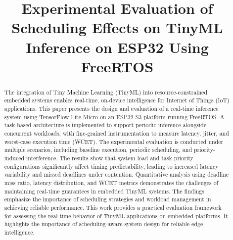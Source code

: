 \documentclass[conference]{IEEEtran}
\begin{document}
\title{Experimental Evaluation of Scheduling Effects on TinyML Inference on ESP32 Using FreeRTOS\\
}


\author{
\and
{}
}




\maketitle
\begin{abstract}
The integration of Tiny Machine Learning (TinyML) into resource-constrained embedded systems enables real-time, on-device intelligence for Internet of Things (IoT) applications. This paper presents the design and evaluation of a real-time inference system using TensorFlow Lite Micro on an ESP32-S3 platform running FreeRTOS. A task-based architecture is implemented to support periodic inference alongside concurrent workloads, with fine-grained instrumentation to measure latency, jitter, and worst-case execution time (WCET). The experimental evaluation is conducted under multiple scenarios, including baseline execution, periodic scheduling, and priority-induced interference. The results show that system load and task priority configurations significantly affect timing predictability, leading to increased latency variability and missed deadlines under contention. Quantitative analysis using deadline miss ratio, latency distribution, and WCET metrics demonstrates the challenges of maintaining real-time guarantees in embedded TinyML systems. The findings emphasize the importance of scheduling strategies and workload management in achieving reliable performance. This work provides a practical evaluation framework for assessing the real-time behavior of TinyML applications on embedded platforms. It highlights the importance of scheduling-aware system design for reliable edge intelligence.
\end{abstract}
\end{document}
